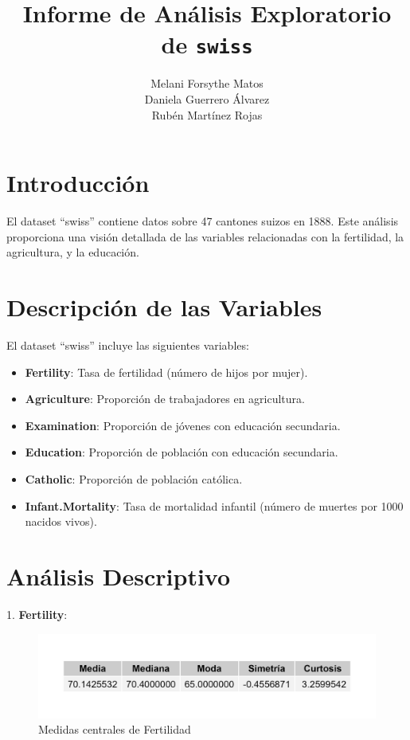 \documentclass{article}
\title{Informe de Análisis Exploratorio de \texttt{swiss}}
\author{
  Melani Forsythe Matos \\
  Daniela Guerrero Álvarez \\
  Rubén Martínez Rojas
}
\date{} %
\begin{document}
\maketitle









\section{Introducción}
El dataset ``swiss'' contiene datos sobre 47 cantones suizos en 1888. Este análisis proporciona una visión detallada de las variables relacionadas con la fertilidad, la agricultura, y la educación.

\section{Descripción de las Variables}
El dataset ``swiss'' incluye las siguientes variables:
\begin{itemize}
    \item \textbf{Fertility}: Tasa de fertilidad (número de hijos por mujer).
    \item \textbf{Agriculture}: Proporción de trabajadores en agricultura.
    \item \textbf{Examination}: Proporción de jóvenes con educación secundaria.
    \item \textbf{Education}: Proporción de población con educación secundaria.
    \item \textbf{Catholic}: Proporción de población católica.
    \item \textbf{Infant.Mortality}: Tasa de mortalidad infantil (número de muertes por 1000 nacidos vivos).
\end{itemize}

\section*{Análisis Descriptivo}

1. \textbf{Fertility}:
\begin{figure}[h!]
 \centering
 \includegraphics[width=\textwidth]{Swiss/Fertility_central.png}
 \caption{Medidas centrales de Fertilidad}
\end{figure}
\end{document}

